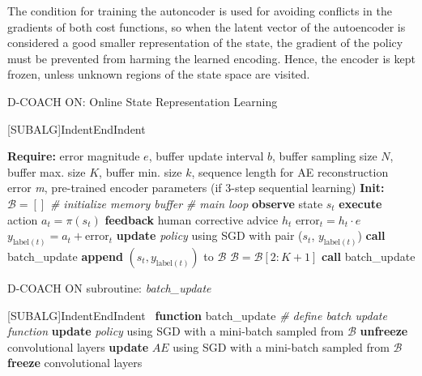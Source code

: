 The condition for training the autoncoder is used for avoiding conflicts in the gradients of both cost functions, so when the latent vector of the autoencoder is considered a good smaller representation of the state, the gradient of the policy must be prevented from harming the learned encoding. Hence, the encoder is kept frozen, unless unknown regions of the state space are visited. 

\begin{algorithm}[h]
\caption{D-COACH ON: Online State Representation Learning}\label{algorithm:EnDeepCOACH}
\begin{algorithmic}[1]
[SUBALG]{Indent}{EndIndent}{}{\algorithmicend\ }%

\State \textbf{Require:} error magnitude $\textit{e}$, buffer update interval $b$, buffer sampling size $N$, buffer max. size $K$, buffer min. size $k$, sequence length for AE reconstruction error \emph{m}, pre-trained encoder parameters (if 3-step sequential learning) 
\State \textbf{Init:} $\mathcal{B} = []$ \emph{\# initialize memory buffer}
 \emph{\# main loop}
\State \textbf{observe} state $s_{t}$
\State \textbf{execute} action $a_{t}=\pi(s_{t})$
\State \textbf{feedback} human corrective advice $h_{t}$
\State $\mathrm{error}_{t} = h_{t}\cdot e$
\State $y_{\mathrm{label}(t)} = a_{t} + \mathrm{error}_{t}$ 
\State \textbf{update} \emph{policy} using SGD with pair ($s_{t}$, $y_{\mathrm{label}(t)}$) 
\State \textbf{call} batch\_update
\State \textbf{append} $(s_{t}, y_{\mathrm{label}(t)})$ to $\mathcal{B}$
\EndIf
{}
\State $\mathcal{B} = \mathcal{B}[2:K+1]$
\EndIf
{}
\State \textbf{call} batch\_update
\EndIf
\EndFor
\end{algorithmic}
\end{algorithm}

\begin{algorithm}[h]
\caption{D-COACH ON subroutine: \emph{batch\_update}}\label{algorithm:batch_update}
\begin{algorithmic}[1]
[SUBALG]{Indent}{EndIndent}{}{\algorithmicend\ }%
\State \textbf{function} batch\_update \emph{\# define batch update function}
\Indent
{}
\State \textbf{update} \emph{policy} using SGD with a mini-batch sampled from $\mathcal{B}$
\State \textbf{unfreeze} convolutional layers
\State \textbf{update} $AE$ using SGD with a mini-batch sampled from $\mathcal{B}$
\Else
\State \textbf{freeze} convolutional layers
\EndIf
\EndIf
\EndIndent
\end{algorithmic}
\end{algorithm}

